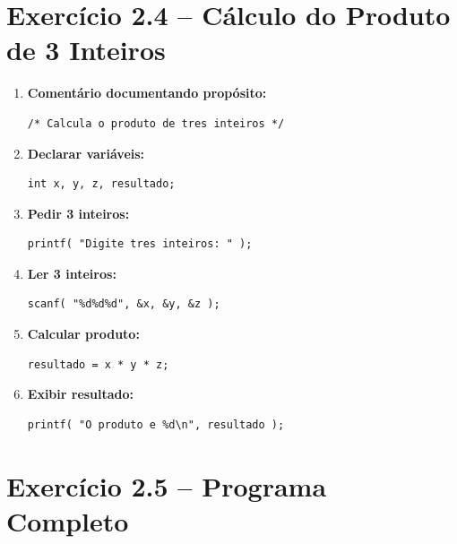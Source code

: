 \documentclass[12pt,a4paper]{article}
\begin{document}
\newpage

\section{Exercício 2.4 -- Cálculo do Produto de 3 Inteiros}

\begin{respostabox}
\begin{enumerate}[label=\textbf{\alph*)}]

\item \textbf{Comentário documentando propósito:}
\begin{lstlisting}
/* Calcula o produto de tres inteiros */
\end{lstlisting}

\item \textbf{Declarar variáveis:}
\begin{lstlisting}
int x, y, z, resultado;
\end{lstlisting}

\item \textbf{Pedir 3 inteiros:}
\begin{lstlisting}
printf( "Digite tres inteiros: " );
\end{lstlisting}

\item \textbf{Ler 3 inteiros:}
\begin{lstlisting}
scanf( "%d%d%d", &x, &y, &z );
\end{lstlisting}

\item \textbf{Calcular produto:}
\begin{lstlisting}
resultado = x * y * z;
\end{lstlisting}

\item \textbf{Exibir resultado:}
\begin{lstlisting}
printf( "O produto e %d\n", resultado );
\end{lstlisting}

\end{enumerate}
\end{respostabox}

\section{Exercício 2.5 -- Programa Completo}
\end{document}
